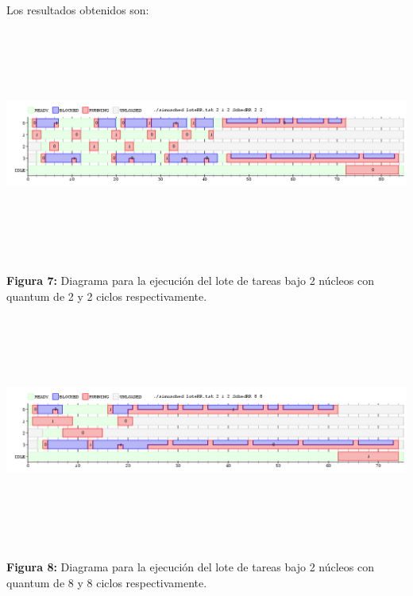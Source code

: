 \documentclass[a4paper]{article}
\begin{document}
Los resultados obtenidos son:

 \includegraphics[width=\textwidth,height=3.0in,keepaspectratio
]{imagenes/ej4/eje1.png} \newline
\begin {flushleft}
\textbf{Figura 7:} Diagrama para la ejecuci\'on del lote de tareas bajo 2 n\'ucleos con quantum de 2 y 2 ciclos respectivamente.
\end{flushleft}

 \includegraphics[width=\textwidth,height=3.0in,keepaspectratio
]{imagenes/ej4/eje2.png} \newline
\begin {flushleft}
\textbf{Figura 8:} Diagrama para la ejecuci\'on del lote de tareas bajo 2 n\'ucleos con quantum de 8 y 8 ciclos respectivamente.
\end{flushleft}
\end{document}

